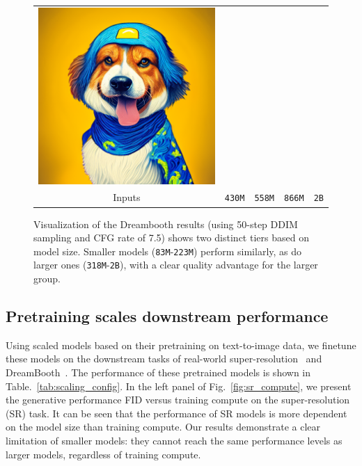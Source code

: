 \begin{figure}[!ht]
\begin{tabular}[t]{c c c c c}
    \includegraphics[width=\xwidth]{cp2/figures/dreambooth/dog/c512_checkpoint_99.png} \\
    Inputs &  \texttt{430M} &  \texttt{558M} &  \texttt{866M} &  \texttt{2B} \\
    
    \end{tabular}
    \caption{
    Visualization of the Dreambooth results (using 50-step DDIM sampling and CFG rate of 7.5) shows two distinct tiers based on model size.  Smaller models (\texttt{83M}-\texttt{223M}) perform similarly, as do larger ones (\texttt{318M}-\texttt{2B}),  with a clear quality advantage for the larger group.
    }
    \label{fig:dreambooth}
\end{figure}

\subsection{Pretraining scales downstream performance}
\label{sec:scalingsr}
Using scaled models based on their pretraining on text-to-image data, we finetune these models on the downstream tasks of real-world super-resolution~\cite{saharia2022image, sahak2023denoising} and DreamBooth~\cite{ruiz2023dreambooth}.
The performance of these pretrained models is shown in Table.~\ref{tab:scaling_config}.
In the left panel of Fig.~\ref{fig:sr_compute}, we present the generative performance FID versus training compute on the super-resolution (SR) task.
It can be seen that the performance of SR models is more dependent on the model size than training compute.
Our results demonstrate a clear limitation of smaller models: they cannot reach the same performance levels as larger models, regardless of training compute.

